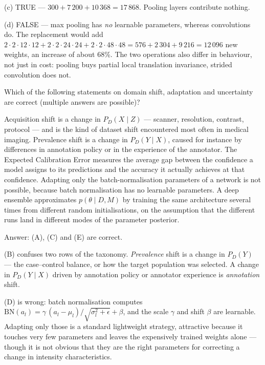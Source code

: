\documentclass[11pt]{exam}
\begin{document}
\begin{questions}
\begin{solution}
  (c) TRUE --- $300 + 7\,200 + 10\,368 = 17\,868$. Pooling layers contribute nothing.

  (d) FALSE --- max pooling has \emph{no} learnable parameters, whereas convolutions do. The
  replacement would add
  $2 \cdot 2 \cdot 12 \cdot 12 + 2 \cdot 2 \cdot 24 \cdot 24 + 2 \cdot 2 \cdot 48 \cdot 48
  = 576 + 2\,304 + 9\,216 = 12\,096$ new weights, an increase of about 68\%. The two operations
  also differ in behaviour, not just in cost: pooling buys partial local translation invariance,
  strided convolution does not.
\end{solution}

\question
Which of the following statements on domain shift, adaptation and uncertainty are correct (multiple
answers are possible)?

\begin{choices}
  \choice Acquisition shift is a change in $P_D(X \mid Z)$ --- scanner, resolution, contrast,
  protocol --- and is the kind of dataset shift encountered most often in medical imaging.
  \choice Prevalence shift is a change in $P_D(Y \mid X)$, caused for instance by differences in
  annotation policy or in the experience of the annotator.
  \choice The Expected Calibration Error measures the average gap between the confidence a model
  assigns to its predictions and the accuracy it actually achieves at that confidence.
  \choice Adapting only the batch-normalisation parameters of a network is not possible, because
  batch normalisation has no learnable parameters.
  \choice A deep ensemble approximates $p(\theta \mid D, M)$ by training the same architecture
  several times from different random initialisations, on the assumption that the different runs
  land in different modes of the parameter posterior.
\end{choices}

\begin{solution}
  Answer: (A), (C) and (E) are correct.

  (B) confuses two rows of the taxonomy. \emph{Prevalence} shift is a change in $P_D(Y)$ --- the
  case--control balance, or how the target population was selected. A change in $P_D(Y \mid X)$
  driven by annotation policy or annotator experience is \emph{annotation} shift.

  (D) is wrong: batch normalisation computes
  $\mathrm{BN}(a_l) = \gamma\,(a_l - \mu_l)/\sqrt{\sigma_l^2 + \epsilon} + \beta$, and the scale
  $\gamma$ and shift $\beta$ are learnable. Adapting only those is a standard lightweight strategy,
  attractive because it touches very few parameters and leaves the expensively trained weights
  alone --- though it is not obvious that they are the right parameters for correcting a change in
  intensity characteristics.
\end{solution}

\end{questions}
\end{document}
